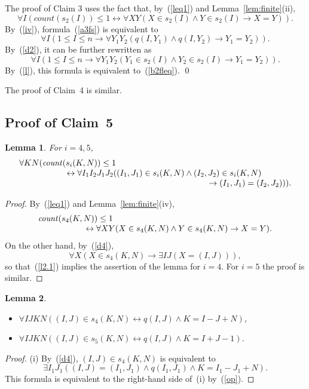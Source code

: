 \documentclass[11pt]{article}
\newtheorem{lemma}{Lemma}
\def\lrar{\leftrightarrow}
\def\beq{\begin{equation}}
\def\eeq#1{\label{#1}\end{equation}}
\def\ba{\begin{array}}
\def\ea{\end{array}}
\newcommand{\co}{\ensuremath{\mathit{count}}}
\begin{document}
\begin{adjustwidth}{-1cm}{-1cm}
The proof of Claim 3 uses the fact that, by~(\ref{leq1}) and
Lemma~\ref{lem:finite}(ii),
\beq
\forall I(\co(s_2(I))\leq 1 \lrar
\forall XY(X\in s_2(I) \land Y\in s_2(I)\to X=Y)).
\eeq{l}
By~(\ref{iv}), formula~(\ref{a3fs})
is equivalent to
$$
\forall I(1\leq I\leq n \to
\forall Y_1Y_2(q(I,Y_1) \land q(I,Y_2) \to Y_1 = Y_2)).
$$
By~(\ref{d2}), it can be further rewritten as
$$
\forall I(1\leq I\leq n \to
\forall Y_1Y_2(Y_1\in s_2(I) \land Y_2\in s_2(I) \to Y_1 = Y_2)).$$
By~(\ref{l}), this formula is equivalent to~(\ref{b2fleq}).
\qed

The proof of Claim~4 is similar.

\subsection{Proof of Claim~5}

\begin{lemma}\label{s4leq1}  For $i=4,5$,
  $$\ba l
  \forall KN(\co(s_i(K,N))\leq 1\\
\hskip 2cm
  \lrar \forall I_1I_2J_1J_2((I_1,J_1)\in s_i(K,N)
  \land (I_2,J_2)\in s_i(K,N)\\
  \hskip 8cm
  \to (I_1,J_1)=(I_2,J_2))).
  \ea$$
\end{lemma}

\begin{proof}
By~(\ref{leq1}) and Lemma~\ref{lem:finite}(iv),
\beq\ba l
\co(s_4(K,N))\leq 1\\
\hskip 2cm
\lrar \forall XY(X\in s_4(K,N) \land Y\in s_4(K,N) \to X=Y).
\ea\eeq{l2.1}
On the other hand, by~(\ref{d4}),
$$\forall X(X\in s_4(K,N) \to \exists IJ(X=(I,J))),$$
so that~(\ref{l2.1}) implies the assertion of the lemma for $i=4$.
For $i=5$ the proof is similar.
\end{proof}

\begin{lemma}\label{d4ij}
\strut\vskip 4mm
  
\begin{itemize}
\item[(i)]
$\forall IJKN((I,J)\in s_4(K,N) \lrar q(I,J) \land K=I-J+N)$,
\item[(ii)]
$\forall IJKN((I,J)\in s_5(K,N) \lrar q(I,J) \land K=I+J-1)$.
\end{itemize}
\end{lemma}
\begin{proof}
(i) By~(\ref{d4}), $(I,J)\in s_4(K,N)$ is equivalent to
$$\exists I_1J_1((I,J)=(I_1,J_1) \land q(I_1,J_1) \land K=I_1-J_1+N).$$
This formula is equivalent to the right-hand side of~(i) by~(\ref{op}).


\end{proof}
\end{adjustwidth}
\end{document}
